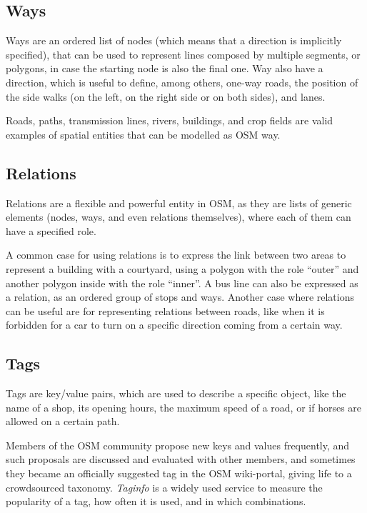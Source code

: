 \documentclass{Configuration_Files/PoliMi3i_thesis}
\begin{document}
\subsection{Ways}

Ways are an ordered list of nodes (which means that a direction is implicitly specified), that can be used to represent lines composed by multiple segments, or polygons, in case the starting node is also the final one. Way also have a direction, which is useful to define, among others, one-way roads, the position of the side walks (on the left, on the right side or on both sides), and lanes.

Roads, paths, transmission lines, rivers, buildings, and crop fields are valid examples of spatial entities that can be modelled as OSM way.

\subsection{Relations}

Relations are a flexible and powerful entity in OSM, as they are lists of generic elements (nodes, ways, and even relations themselves), where each of them can have a specified role.

A common case for using relations is to express the link between two areas to represent a building with a courtyard, using a polygon with the role “outer” and another polygon inside with the role “inner”.
A bus line can also be expressed as a relation, as an ordered group of stops and ways.
Another case where relations can be useful are for representing relations between roads, like when it is forbidden for a car to turn on a specific direction coming from a certain way.

\subsection{Tags}

Tags are key/value pairs, which are used to describe a specific object, like the name of a shop, its opening hours, the maximum speed of a road, or if horses are allowed on a certain path.

Members of the OSM community propose new keys and values frequently, and such proposals are discussed and evaluated with other members, and sometimes they became an officially suggested tag in the OSM wiki-portal, giving life to a crowdsourced taxonomy. \textit{Taginfo} \cite{OpenStreetMapTaginfo} is a widely used service to measure the popularity of a tag, how often it is used, and in which combinations.
\end{document}
